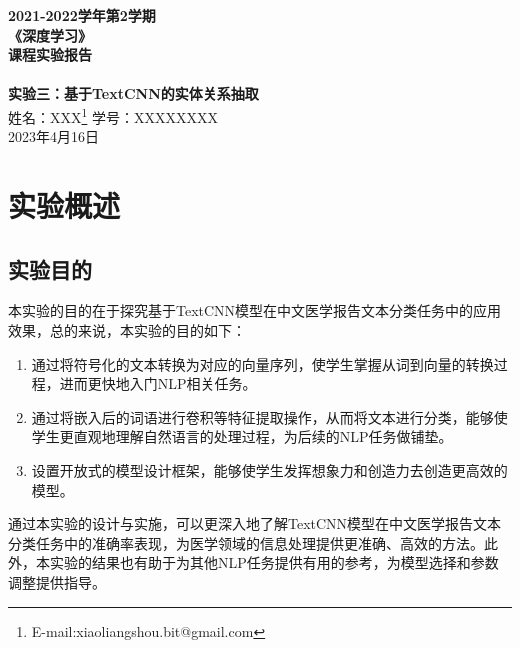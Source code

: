 \documentclass{report}
\begin{document}
	\begin{titlepage}
		\begin{center}
			{\LARGE \textbf{2021-2022学年第2学期\\《深度学习》\\课程实验报告\\ \quad \\ \textbf{实验三：基于TextCNN的实体关系抽取}}}\\[2cm]
			{\Large 姓名：XXX\thanks{E-mail:xiaoliangshou.bit@gmail.com} \qquad 学号：XXXXXXXX}\\[1cm]
			{\Large 2023年4月16日}\\[2cm]
		\end{center}
	\end{titlepage}
	
	\chapter{实验概述}
	\section{实验目的}
	本实验的目的在于探究基于TextCNN模型在中文医学报告文本分类任务中的应用效果，总的来说，本实验的目的如下：
	
	\begin{enumerate}
		\item 通过将符号化的文本转换为对应的向量序列，使学生掌握从词到向量的转换过程，进而更快地入门NLP相关任务。
		\item 通过将嵌入后的词语进行卷积等特征提取操作，从而将文本进行分类，能够使学生更直观地理解自然语言的处理过程，为后续的NLP任务做铺垫。
		\item 设置开放式的模型设计框架，能够使学生发挥想象力和创造力去创造更高效的模型。
	\end{enumerate}
	
	通过本实验的设计与实施，可以更深入地了解TextCNN模型在中文医学报告文本分类任务中的准确率表现，为医学领域的信息处理提供更准确、高效的方法。此外，本实验的结果也有助于为其他NLP任务提供有用的参考，为模型选择和参数调整提供指导。
	
\end{document}

